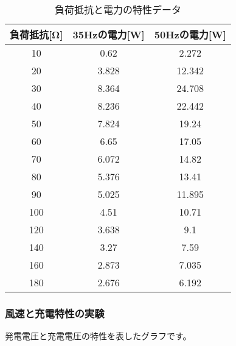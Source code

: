 \documentclass[a4paper,11pt,xelatex,ja=standard]{bxjsarticle}
\begin{document}
            \begin{table}[H]
                \centering
                \caption{負荷抵抗と電力の特性データ}
                \begin{tabular}{|c|c|c|}
                    \hline
                    負荷抵抗[Ω] & 35Hzの電力[W] & 50Hzの電力[W] \\
                    \hline
                    10 & 0.62 & 2.272 \\
                    20 & 3.828 & 12.342 \\
                    30 & 8.364 & 24.708 \\
                    40 & 8.236 & 22.442 \\
                    50 & 7.824 & 19.24 \\
                    60 & 6.65 & 17.05 \\
                    70 & 6.072 & 14.82 \\
                    80 & 5.376 & 13.41 \\
                    90 & 5.025 & 11.895 \\
                    100 & 4.51 & 10.71 \\
                    120 & 3.638 & 9.1 \\
                    140 & 3.27 & 7.59 \\
                    160 & 2.873 & 7.035 \\
                    180 & 2.676 & 6.192 \\
                    \hline
                \end{tabular}
            \end{table}
            

        \subsubsection{風速と充電特性の実験}

            発電電圧と充電電圧の特性を表したグラフです。
\end{document}
